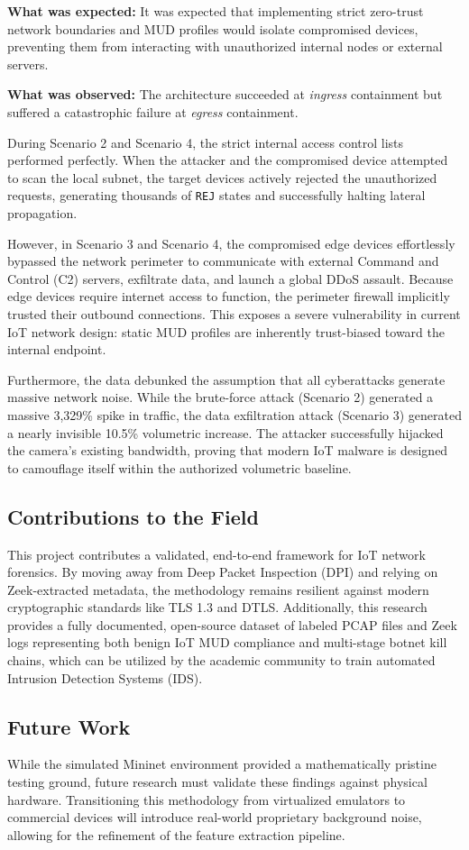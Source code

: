 \textbf{What was expected:} It was expected that implementing strict zero-trust network boundaries and MUD profiles would isolate compromised devices, preventing them from interacting with unauthorized internal nodes or external servers.

\textbf{What was observed:} The architecture succeeded at \textit{ingress} containment but suffered a catastrophic failure at \textit{egress} containment. 

During Scenario 2 and Scenario 4, the strict internal access control lists performed perfectly. When the attacker and the compromised device attempted to scan the local subnet, the target devices actively rejected the unauthorized requests, generating thousands of \texttt{REJ} states and successfully halting lateral propagation. 

However, in Scenario 3 and Scenario 4, the compromised edge devices effortlessly bypassed the network perimeter to communicate with external Command and Control (C2) servers, exfiltrate data, and launch a global DDoS assault. Because edge devices require internet access to function, the perimeter firewall implicitly trusted their outbound connections. This exposes a severe vulnerability in current IoT network design: static MUD profiles are inherently trust-biased toward the internal endpoint. 

Furthermore, the data debunked the assumption that all cyberattacks generate massive network noise. While the brute-force attack (Scenario 2) generated a massive 3,329\% spike in traffic, the data exfiltration attack (Scenario 3) generated a nearly invisible 10.5\% volumetric increase. The attacker successfully hijacked the camera's existing bandwidth, proving that modern IoT malware is designed to camouflage itself within the authorized volumetric baseline.

\subsection{Contributions to the Field}

This project contributes a validated, end-to-end framework for IoT network forensics. By moving away from Deep Packet Inspection (DPI) and relying on Zeek-extracted metadata, the methodology remains resilient against modern cryptographic standards like TLS 1.3 and DTLS. Additionally, this research provides a fully documented, open-source dataset of labeled PCAP files and Zeek logs representing both benign IoT MUD compliance and multi-stage botnet kill chains, which can be utilized by the academic community to train automated Intrusion Detection Systems (IDS).

\subsection{Future Work}

While the simulated Mininet environment provided a mathematically pristine testing ground, future research must validate these findings against physical hardware. Transitioning this methodology from virtualized emulators to commercial devices will introduce real-world proprietary background noise, allowing for the refinement of the feature extraction pipeline. 